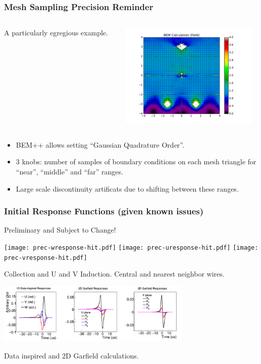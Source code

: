 \documentclass[xcolor=dvipsnames]{beamer}
\begin{document}
\begin{frame}
  \frametitle{Mesh Sampling Precision Reminder} 
  \begin{columns}
    \begin{column}{0.3\textwidth}
      \begin{center}
        A particularly egregious example. 
      \end{center}
    \end{column}
    \begin{column}{0.7\textwidth}
      \begin{center}
        \includegraphics[height=5cm,clip,trim=2cm 1cm 2cm 1cm]{uboone-drift-field-tight.pdf}    
      \end{center}
    \end{column}
  \end{columns}
  \begin{itemize}\footnotesize
  \item BEM++ allows setting ``Gaussian Quadrature Order''.
  \item 3 knobs: number of samples of boundary conditions on each mesh triangle
    for ``near'', ``middle'' and ``far'' ranges.
  \item Large scale discontinuity artificats due to shifting between these ranges.
  \end{itemize}
\end{frame}

\begin{frame}
  \frametitle{Initial Response Functions (given known issues)}
  
  \footnotesize

  \begin{center}
    Preliminary and Subject to Change!

    \texttt{[image: prec-wresponse-hit.pdf]}%
    \texttt{[image: prec-uresponse-hit.pdf]}%
    \texttt{[image: prec-vresponse-hit.pdf]}

    Collection and U and V Induction.  Central and nearest neighbor wires.

    \includegraphics[width=0.7\textwidth]{overall_response.png}

    Data inspired and 2D Garfield calculations.
  \end{center}

\end{frame}
\end{document}
